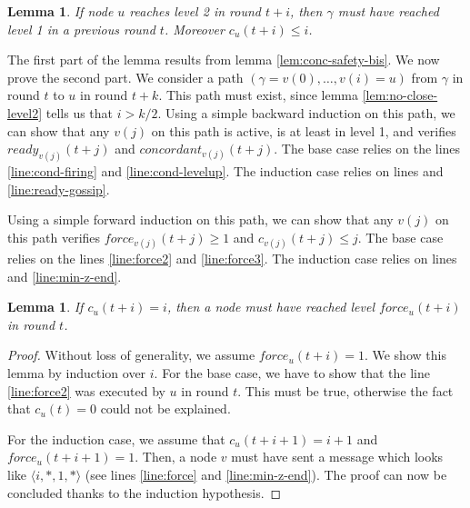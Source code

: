 \documentclass[11pt,letterpaper]{article}
\renewcommand{\leq}{\leqslant}
\renewcommand{\geq}{\geqslant}
\newtheorem{lem}[thm]{Lemma}
\newcommand{\cent}{\gamma}
\begin{document}
\begin{lem} \label{lem:ready-safety}
	If node $u$ reaches level 2 in round $t+i$, then $\cent$ must have reached level 1 in a previous round $t$. Moreover $c_u(t+i) \leq i$.
\end{lem}
\begin{peoof}
	The first part of the lemma results from lemma \ref{lem:conc-safety-bis}. We now prove the second part.
	We consider a path $(\cent = v(0), \dots, v(i) = u)$ from $\cent$ in round $t$ to $u$ in round $t+k$. This path must exist, since lemma \ref{lem:no-close-level2} tells us that $i > k/2$.
	Using a simple backward induction on this path, we can show that any $v(j)$ on this path is active, is at least in level 1, and verifies $ready_{v(j)}(t+j)$ and $concordant_{v(j)}(t+j)$.
	The base case relies on the lines \ref{line:cond-firing} and \ref{line:cond-levelup}. The induction case relies on lines \label{line:ready-gossip} and \ref{line:ready-gossip}.

	Using a simple forward induction on this path, we can show that any $v(j)$ on this path verifies $force_{v(j)}(t+j) \geq 1$ and $c_{v(j)}(t+j) \leq j$.
	The base case relies on the lines \ref{line:force2} and \ref{line:force3}. The induction case relies on lines \label{line:force} and \ref{line:min-z-end}.
\end{peoof}

\begin{lem} \label{lem:safety-force}
	If $c_u(t+i) = i$, then a node must have reached level $force_u(t+i)$ in round $t$.
\end{lem}
\begin{proof}
	Without loss of generality, we assume $force_u(t+i) = 1$.
	We show this lemma by induction over $i$.
	For the base case, we have to show that the line \ref{line:force2} was executed by $u$ in round $t$.
	This must be true, otherwise the fact that $c_u(t) = 0$ could not be explained.

	For the induction case, we assume that $c_u(t+i+1) = i+1$ and $force_u(t+i+1) = 1$.
	Then, a node $v$ must have sent a message which looks like $\langle i, *, 1, * \rangle$ (see lines \ref{line:force} and \ref{line:min-z-end}).
	The proof can now be concluded thanks to the induction hypothesis.
\end{proof}
\end{document}
